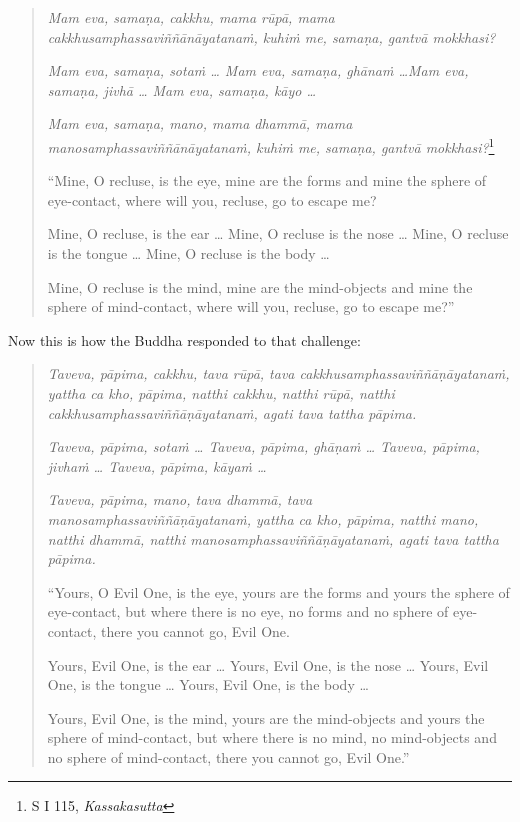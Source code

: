 \begin{quote}
\emph{Mam eva, samaṇa, cakkhu, mama rūpā, mama cakkhusamphassaviññānāyatanaṁ, kuhiṁ me, samaṇa, gantvā mokkhasi?}

\emph{Mam eva, samaṇa, sotaṁ \ldots{} Mam eva, samaṇa, ghānaṁ \ldots Mam eva, samaṇa, jivhā \ldots{} Mam eva, samaṇa, kāyo \ldots{}}

\emph{Mam eva, samaṇa, mano, mama dhammā, mama manosamphassaviññānāyatanaṁ, kuhiṁ me, samaṇa, gantvā mokkhasi?}\footnote{S I 115, \emph{Kassakasutta}}

``Mine, O recluse, is the eye, mine are the forms and mine the sphere of eye-contact, where will you, recluse, go to escape me?

Mine, O recluse, is the ear \ldots{} Mine, O recluse is the nose \ldots{} Mine, O recluse is the tongue \ldots{} Mine, O recluse is the body \ldots{}

Mine, O recluse is the mind, mine are the mind-objects and mine the sphere of mind-contact, where will you, recluse, go to escape me?''
\end{quote}

Now this is how the Buddha responded to that challenge:

\begin{quote}
\emph{Taveva, pāpima, cakkhu, tava rūpā, tava cakkhusamphassaviññāṇāyatanaṁ, yattha ca kho, pāpima, natthi cakkhu, natthi rūpā, natthi cakkhusamphassaviññāṇāyatanaṁ, agati tava tattha pāpima.}

\emph{Taveva, pāpima, sotaṁ \ldots{} Taveva, pāpima, ghāṇaṁ \ldots{} Taveva, pāpima, jivhaṁ \ldots{} Taveva, pāpima, kāyaṁ \ldots{}}

\emph{Taveva, pāpima, mano, tava dhammā, tava manosamphassaviññāṇāyatanaṁ, yattha ca kho, pāpima, natthi mano, natthi dhammā, natthi manosamphassaviññāṇāyatanaṁ, agati tava tattha pāpima.}

``Yours, O Evil One, is the eye, yours are the forms and yours the sphere of eye-contact, but where there is no eye, no forms and no sphere of eye-contact, there you cannot go, Evil One.

Yours, Evil One, is the ear \ldots{} Yours, Evil One, is the nose \ldots{} Yours, Evil One, is the tongue \ldots{} Yours, Evil One, is the body \ldots{}

Yours, Evil One, is the mind, yours are the mind-objects and yours the sphere of mind-contact, but where there is no mind, no mind-objects and no sphere of mind-contact, there you cannot go, Evil One.''
\end{quote}

